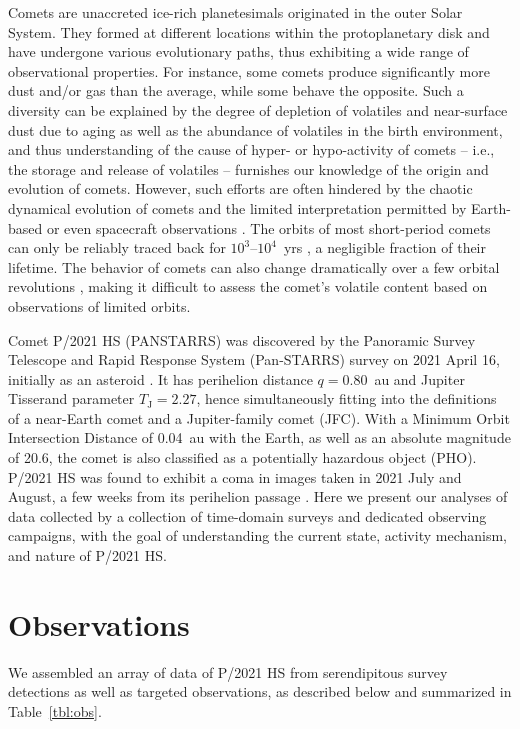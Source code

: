 \documentclass[modern]{aastex631}
\begin{document}
\begin{CJK*}{UTF8}{gbsn}
Comets are unaccreted ice-rich planetesimals originated in the outer Solar System. They formed at different locations within the protoplanetary disk and have undergone various evolutionary paths, thus exhibiting a wide range of observational properties. For instance, some comets produce significantly more dust and/or gas than the average, while some behave the opposite. Such a diversity can be explained by the degree of depletion of volatiles and near-surface dust due to aging as well as the abundance of volatiles in the birth environment, and thus understanding of the cause of hyper- or hypo-activity of comets -- i.e., the storage and release of volatiles -- furnishes our knowledge of the origin and evolution of comets. However, such efforts are often hindered by the chaotic dynamical evolution of comets and the limited interpretation permitted by Earth-based or even spacecraft observations \citep[e.g.,][]{Choukroun2020}. The orbits of most short-period comets can only be reliably traced back for $10^3$--$10^4$~yrs \citep{Tancredi2014}, a negligible fraction of their lifetime. The behavior of comets can also change dramatically over a few orbital revolutions \citep[e.g. 240P/NEAT, 252P/LINEAR,][]{Kelley2019, Li2017}, making it difficult to assess the comet's volatile content based on observations of limited orbits.

Comet P/2021 HS (PANSTARRS) was discovered by the Panoramic Survey Telescope and Rapid Response System (Pan-STARRS) survey on 2021 April 16, initially as an asteroid \citep{MPC2021}. It has perihelion distance $q=0.80$~au and Jupiter Tisserand parameter $T_\mathrm{J}=2.27$, hence simultaneously fitting into the definitions of a near-Earth comet and a Jupiter-family comet (JFC). With a Minimum Orbit Intersection Distance of 0.04~au with the Earth, as well as an absolute magnitude of 20.6, the comet is also classified as a potentially hazardous object (PHO). P/2021 HS was found to exhibit a coma in images taken in 2021 July and August, a few weeks from its perihelion passage \citep{CBET5043}. Here we present our analyses of data collected by a collection of time-domain surveys and dedicated observing campaigns, with the goal of understanding the current state, activity mechanism, and nature of P/2021 HS.

\section{Observations}

We assembled an array of data of P/2021 HS from serendipitous survey detections as well as targeted observations, as described below and summarized in Table~\ref{tbl:obs}.


\end{CJK*}
\end{document}
